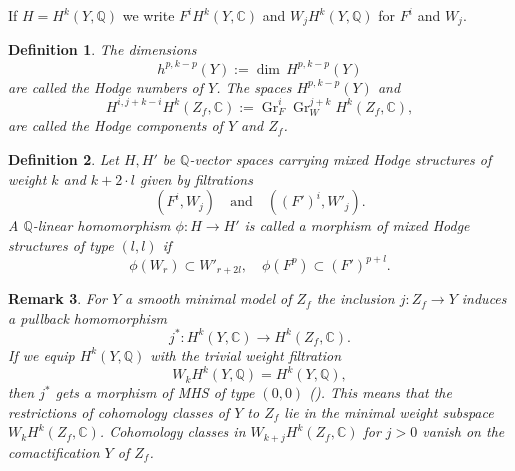 \documentclass[12pt, english]{article}
\newtheorem{definition}{Definition}[section]
\newtheorem{remark}[definition]{Remark}
\DeclareMathOperator{\Gr}{Gr}
\begin{document}
If $H = H^k(Y,\mathbb{Q})$ we write $F^iH^k(Y,\mathbb{C})$ and $W_j H^k(Y, \mathbb{Q})$ for $F^i$ and $W_j$.

\begin{definition}
	The dimensions 
	\[ h^{p,k-p}(Y) := \dim \, H^{p,k-p}(Y) \] 
	are called the \textit{Hodge numbers} of $Y$. The spaces $H^{p,k-p}(Y)$ and 
	\[ H^{i,j+k-i}H^k(Z_f, \mathbb{C}) :=  \Gr_F^i \Gr_W^{j+k} H^k(Z_f, \mathbb{C}),\]  %
	are called the Hodge components of $Y$ and $Z_f$.
\end{definition}

\begin{definition}
	Let $H, H'$ be $\mathbb{Q}$-vector spaces carrying mixed Hodge structures of weight $k$ and $k+2 \cdot l$ given by filtrations 
	\[ (F^i,W_j) \quad \textrm{and} \quad  ((F')^i,W'_j). \] 
	A $\mathbb{Q}$-linear homomorphism $\phi: H \rightarrow H'$ is called a morphism of mixed Hodge structures of type $(l,l)$ if
	\[ \phi(W_r) \subset W'_{r+2 l}, \quad \phi(F^p) \subset (F')^{p+l}.  \]
\end{definition}

\begin{remark} \label{remark_pullback_morphism_of_MHS}
	\normalfont
	For $Y$ a smooth minimal model of $Z_f$ the inclusion $j: Z_f \rightarrow Y$ induces a pullback homomorphism 
	\[ j^*: H^k(Y, \mathbb{C}) \rightarrow H^k(Z_f, \mathbb{C}). \]
	If we equip $H^k(Y, \mathbb{Q})$ with the trivial weight filtration 
	\[ W_k H^k(Y,\mathbb{Q}) = H^k(Y, \mathbb{Q}), \] 
	then $j^*$ gets a morphism of MHS of type $(0,0)$ (\cite[Ch.7]{Voi02}). This means that the restrictions of cohomology classes of $Y$ to $Z_f$ lie in the minimal weight subspace $W_k H^k(Z_f,\mathbb{C})$. Cohomology classes in $W_{k+j} H^k(Z_f,\mathbb{C})$ for $j>0$ vanish on the comactification $Y$ of $Z_f$.
\end{remark}
\end{document}
